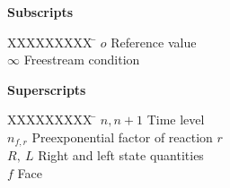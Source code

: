 \textbf{Subscripts}
\begin{tabbing}
  XXXXXXXXX \= \kill%
  $o$ \> Reference value \\
  $\infty$ \> Freestream condition \\
\end{tabbing}

\textbf{Superscripts}
\begin{tabbing}
  XXXXXXXXX \= \kill%
  $n, n+1$ \> Time level \\
  $n_{f,r}$ \> Preexponential factor of reaction $r$ \\
  $R,\ L$ \> Right and left state quantities \\
  $f$ \> Face
\end{tabbing}

